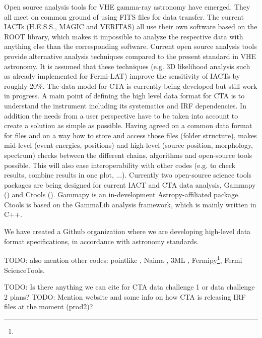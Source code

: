 Open source analysis tools for VHE gamma-ray astronomy have emerged. They all meet on common ground of using FITS files for data transfer. The current IACTs (H.E.S.S., MAGIC and VERITAS) all use their own software based on the ROOT library, which makes it impossible to analyze the respective data with anything else than the corresponding software. Current open source analysis tools provide alternative analysis techniques compared to the present standard in VHE astronomy. It is assumed that these techniques (e.g. 3D likelihood analysis such as already implemented for Fermi-LAT) improve the sensitivity of IACTs by roughly 20\%. The data model for CTA is currently being developed but still work in progress. A main point of defining the high level data format for CTA is to understand the instrument including its systematics and IRF dependencies. In addition the needs from a user perspective have to be taken into account to create a solution as simple as possible. Having agreed on a common data format for files and on a way how to store and access those files (folder structure), makes mid-level (event energies, positions) and high-level (source position, morphology, spectrum) checks between the different chains, algorithms and open-source tools possible. This will also ease interoperability with other codes (e.g. to check results, combine results in one plot, ...). Currently two open-source science tools packages are being designed for current IACT and CTA data analysis, Gammapy (\cite{2015arXiv150907408D}) and Ctools (\cite{2016AnA...593A...1K}). Gammapy is an in-development Astropy-affiliated package. Ctools is based on the GammaLib analysis framework, which is mainly written in C++.

We have created a Github organization where we are developing high-level data format specifications, in accordance with astronomy standards. 

TODO: also mention other codes: pointlike \citep{2010PhDT.......147K},
Naima \citep{2015arXiv150903319Z}, 3ML \citep{2015arXiv150708343V},
Fermipy\footnote{\fermipy}, Fermi ScienceTools.

TODO: Is there anything we can cite for CTA data challenge 1 or data challenge 2 plans?
TODO: Mention website and some info on how CTA is releasing IRF files at the moment (prod2)?
